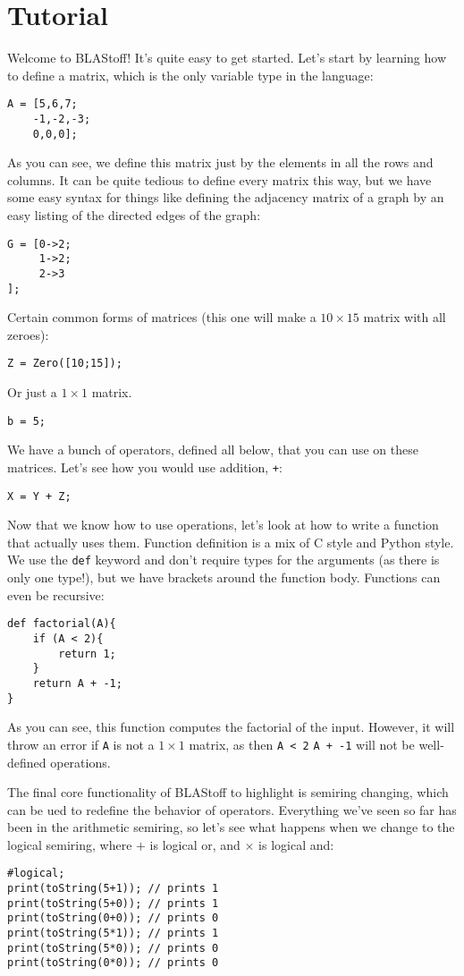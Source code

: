 \section{Tutorial}

Welcome to BLAStoff!  It's quite easy to get started.  Let's start by learning how to define a matrix, which is the only variable type in the language:
\begin{lstlisting}
A = [5,6,7;
    -1,-2,-3;
    0,0,0];
\end{lstlisting}

As you can see, we define this matrix just by the elements in all the rows and columns.  It can be quite tedious to define every matrix this way, but we have some easy syntax for things like defining the adjacency matrix of a graph by an easy listing of the directed edges of the graph:
\begin{lstlisting}
G = [0->2;
     1->2;
     2->3
];
\end{lstlisting}

Certain common forms of matrices (this one will make a $10\times15$ matrix with all zeroes):
\begin{lstlisting}
Z = Zero([10;15]);
\end{lstlisting}

Or just a $1\times1$ matrix.
\begin{lstlisting}
b = 5;
\end{lstlisting}

We have a bunch of operators, defined all below, that you can use on these matrices.  Let's see how you would use addition, \verb=+=:
\begin{lstlisting}
X = Y + Z;
\end{lstlisting}

Now that we know how to use operations, let's look at how to write a function that actually uses them. Function definition is a mix of C style and Python style.  We use the \verb=def= keyword and don't require types for the arguments (as there is only one type!), but we have brackets around the function body.  Functions can even be recursive:
\begin{lstlisting}
def factorial(A){
    if (A < 2){
        return 1;
    }
    return A + -1;
}
\end{lstlisting}
As you can see, this function computes the factorial of the input.  However, it will throw an error if \verb=A= is not a $1\times 1$ matrix, as then \verb=A < 2= \verb=A + -1= will not be well-defined operations.

The final core functionality of BLAStoff to highlight is semiring changing, which can be ued to redefine the behavior of operators.  Everything we've seen so far has been in the arithmetic semiring, so let's see what happens when we change to the logical semiring, where $+$ is logical or, and $\times$ is logical and:
\begin{lstlisting}
#logical;
print(toString(5+1)); // prints 1
print(toString(5+0)); // prints 1
print(toString(0+0)); // prints 0
print(toString(5*1)); // prints 1
print(toString(5*0)); // prints 0
print(toString(0*0)); // prints 0
\end{lstlisting}
